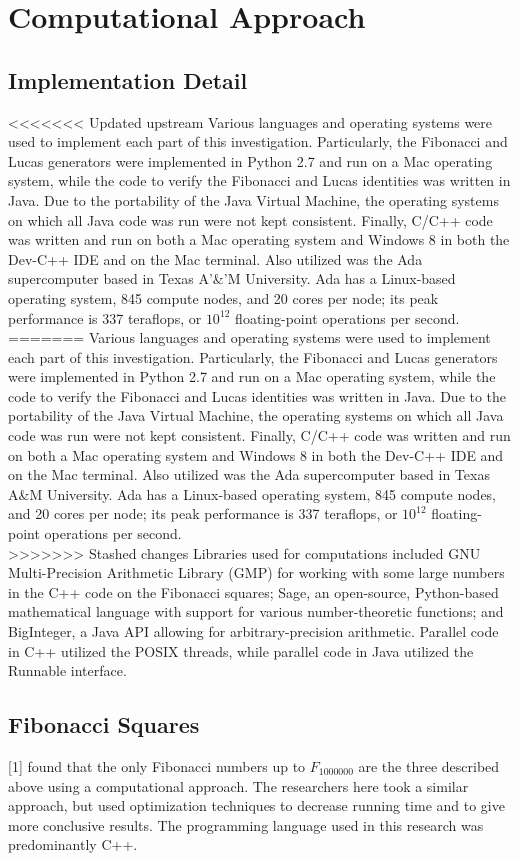 \documentclass[11pt]{article}
\begin{document}
\section{Computational Approach}
\subsection{Implementation Detail}
<<<<<<< Updated upstream
Various languages and operating systems were used to implement each part of this investigation. Particularly, the Fibonacci and Lucas generators were implemented in Python 2.7 and run on a Mac operating system, while the code to verify the Fibonacci and Lucas identities was written in Java. Due to the portability of the Java Virtual Machine, the operating systems on which all Java code was run were not kept consistent. Finally, C/C++ code was written and run on both a Mac operating system and Windows 8 in both the Dev-C++ IDE and on the Mac terminal. Also utilized was the Ada supercomputer based in Texas A'\&'M University. Ada has a Linux-based operating system, 845 compute nodes, and 20 cores per node; its peak performance is 337 teraflops, or $10^{12}$ floating-point operations per second. \\
=======
Various languages and operating systems were used to implement each part of this investigation. Particularly, the Fibonacci and Lucas generators were implemented in Python 2.7 and run on a Mac operating system, while the code to verify the Fibonacci and Lucas identities was written in Java. Due to the portability of the Java Virtual Machine, the operating systems on which all Java code was run were not kept consistent. Finally, C/C++ code was written and run on both a Mac operating system and Windows 8 in both the Dev-C++ IDE and on the Mac terminal. Also utilized was the Ada supercomputer based in Texas A\&M University. Ada has a Linux-based operating system, 845 compute nodes, and 20 cores per node; its peak performance is 337 teraflops, or $10^{12}$ floating-point operations per second. \\
>>>>>>> Stashed changes
Libraries used for computations included GNU Multi-Precision Arithmetic Library (GMP) for working with some large numbers in the C++ code on the Fibonacci squares; Sage, an open-source, Python-based mathematical language with support for various number-theoretic functions; and BigInteger, a Java API allowing for arbitrary-precision arithmetic. Parallel code in C++ utilized the POSIX threads, while parallel code in Java utilized the Runnable interface.
\subsection{Fibonacci Squares}
[1] found that the only Fibonacci numbers up to $F_{1000000}$ are the three described above using a computational approach. The researchers here took a similar approach, but used optimization techniques to decrease running time and to give more conclusive results. The programming language used in this research was predominantly C++.
\end{document}
